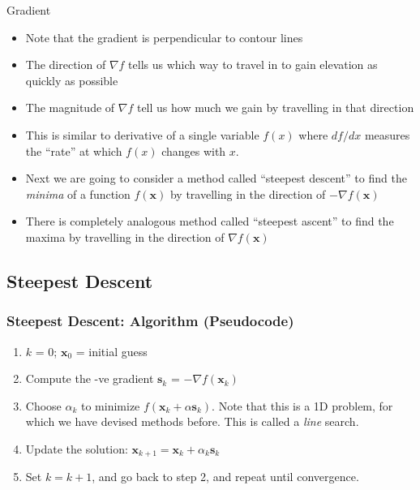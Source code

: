 \documentclass[xcolor=dvipsnames,11pt]{beamer}
\begin{document}
\begin{frame}{Gradient}
	\begin{itemize}
		\item Note that the gradient is perpendicular to contour lines
		\item The direction of $\nabla f$ tells us which way to travel in to gain elevation as quickly as possible
		\item The magnitude of $\nabla f$ tell us how much we gain by travelling in that direction
		\item This is similar to derivative of a single variable $f(x)$ where $df/dx$ measures the ``rate'' at which $f(x)$ changes with $x$.
		\item Next we are going to consider a method called ``steepest descent'' to find the \textit{minima} of a function $f(\mathbf{x})$ by travelling in the direction of $-\nabla f(\mathbf{x})$
		\item There is completely analogous method called ``steepest ascent'' to find the maxima by travelling in the direction of $\nabla f(\mathbf{x})$
	\end{itemize}
\end{frame}




\subsection{Steepest Descent}

\begin{frame}[fragile]
	\frametitle{Steepest Descent: Algorithm (Pseudocode)}
	
	\begin{enumerate}
		\item $k$ = 0; $\mathbf{x}_0$ = initial guess
		\item Compute the -ve gradient $\mathbf{s}_k$ = $-\nabla f(\mathbf{x}_k)$
		\item Choose $\alpha_k$ to minimize $f(\mathbf{x}_k + \alpha \mathbf{s}_k)$. Note that this is a 1D problem, for which we have devised methods before. This is called a \textit{line} search.
		\item Update the solution: $\mathbf{x}_{k+1} = \mathbf{x}_k + \alpha_k \mathbf{s}_k$
		\item Set $k = k + 1$, and go back to step 2, and repeat until convergence.    
	\end{enumerate}
	
\end{frame}
\end{document}
